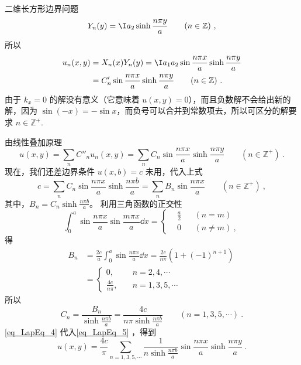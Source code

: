 \begin{example}{二维长方形边界问题}
\begin{equation}
Y_n(y)=\I a_2\sinh\frac{n\pi y}{a}\qquad (n\in \mathbb{Z})~,
\end{equation}
所以
\begin{equation}
\begin{aligned}
u_n(x,y)&=X_n(x)Y_n(y)=\I a_1a_2\sin\frac{n\pi x}{a}\sinh\frac{n\pi y}{a}\\
&=C'_n\sin\frac{n\pi x}{a}\sinh\frac{n\pi y}{a} \qquad (n\in\mathbb{Z})~.
\end{aligned}
\end{equation}
由于 $k_x=0$ 的解没有意义（它意味着 $u(x,y)=0$），而且负数解不会给出新的解，因为 $\sin(-x)=-\sin x$，而负号可以合并到常数项去，所以可区分的解要求 $n\in\mathbb{Z^+}$.

由线性叠加原理
\begin{equation}\label{eq_LapEq_5}
u(x,y)=\sum_n C''_n u_n(x,y)=\sum_n C_n\sin\frac{n\pi x}{a}\sinh\frac{n\pi y}{a} \qquad  (n\in\mathbb{Z^+})~.
\end{equation}
现在，我们还差边界条件 $u(x,b)=c$ 未用，代入上式
\begin{equation}
c=\sum_n C_n\sin\frac{n\pi x}{a}\sinh\frac{n\pi b}{a}=\sum_n B_n\sin\frac{n\pi x}{a} \qquad (n\in\mathbb{Z^+})~,
\end{equation}
其中，$B_n=C_n\sinh \frac{n\pi b}{a}$。
利用三角函数的正交性
\begin{equation}
\int_0^a\sin\frac{n\pi x}{a}\sin\frac{m\pi x}{a}\dd x=\left\{\begin{aligned}
&\frac{a}{2}&&(n=m)\\
& 0     &&(n\neq m)~,
\end{aligned}\right.
\end{equation}
得
\begin{equation}
\begin{aligned}
B_n
&=\frac{2c}{a}\int_0^a\sin\frac{n\pi x}{a}\dd x=\frac{2c}{n\pi}(1+(-1)^{n+1})\\
&=\left\{\begin{aligned}
0,&\quad n=2,4,\cdots~\\
\frac{4c}{n\pi},&\quad n=1,3,5,\cdots~
\end{aligned}\right.
\end{aligned}~
\end{equation}
所以
\begin{equation}\label{eq_LapEq_4}
C_n=\frac{B_n}{\sinh \frac{n\pi b}{a}}=\frac{4c}{n\pi\sinh \frac{n\pi b}{a}}\qquad
(n=1,3,5,\cdots)~.
\end{equation}
\autoref{eq_LapEq_4} 代入\autoref{eq_LapEq_5} ，得到
\begin{equation}
u(x,y)=\frac{4c}{\pi}\sum_{n=1,3,5,\cdots} \frac{1}{n\sinh \frac{n\pi b}{a}}\sin\frac{n\pi x}{a}\sinh\frac{n\pi y}{a}~.
\end{equation}
\end{example}
